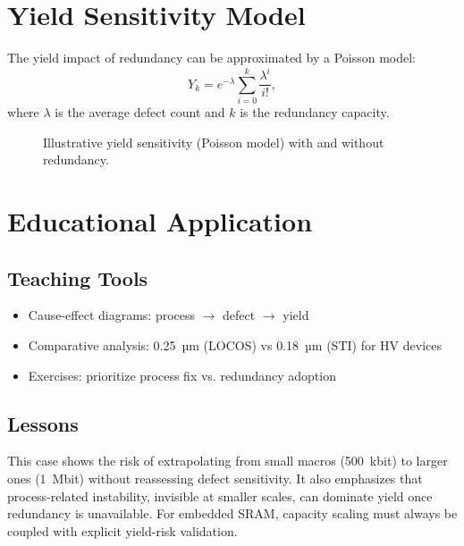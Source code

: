 \documentclass[conference]{IEEEtran}
\begin{document}
\section{Yield Sensitivity Model}
The yield impact of redundancy can be approximated by a Poisson model:
\[
Y_k = e^{-\lambda} \sum_{i=0}^{k} \frac{\lambda^i}{i!},
\]
where $\lambda$ is the average defect count and $k$ is the redundancy capacity.

\begin{figure}[!t]
  \centering
  \caption{Illustrative yield sensitivity (Poisson model) with and without redundancy.}
  \label{fig:yield}
\end{figure}

\section{Educational Application}
\subsection{Teaching Tools}
\begin{itemize}
    \item Cause-effect diagrams: process $\rightarrow$ defect $\rightarrow$ yield
    \item Comparative analysis: 0.25~µm (LOCOS) vs 0.18~µm (STI) for HV devices
    \item Exercises: prioritize process fix vs. redundancy adoption
\end{itemize}

\subsection{Lessons}
This case shows the risk of extrapolating from small macros (500~kbit) to larger ones (1~Mbit) without reassessing defect sensitivity.  
It also emphasizes that process-related instability, invisible at smaller scales, can dominate yield once redundancy is unavailable.  
For embedded SRAM, capacity scaling must always be coupled with explicit yield-risk validation.
\end{document}
